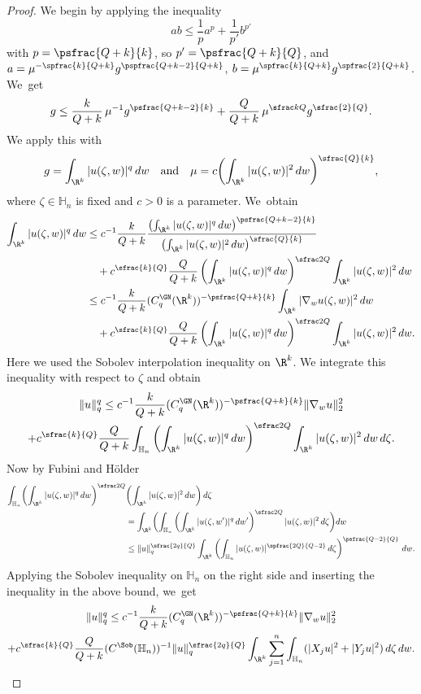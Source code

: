 \begin{proof}
We begin by applying the inequality
\[
ab \leq \frac1p a^p + \frac1{p'} b^{p'}
\]
with $p=\psfrac{Q+k}{k}$, so $p'=\psfrac{Q+k}{Q}$, and $a=\mu^{-\spfrac{k}{Q+k}} g^{\pspfrac{Q+k-2}{Q+k}}$, $b= \mu^{\spfrac{k}{Q+k}} g^{\spfrac{2}{Q+k}}$. We~get
\[
g \leq \frac{k}{Q+k}\,\mu^{-1} g^{\psfrac{Q+k-2}{k}} + \frac{Q}{Q+k}\,\mu^{\sfrac kQ} g^{\sfrac{2}{Q}}.
\]
We apply this with
\[
g = \int_{\R^k} |u(\zeta,w)|^q\,dw
\quad\text{and}\quad
\mu = c\biggl(\int_{\R^k} |u(\zeta,w)|^2\,dw\biggr)^{\sfrac{Q}{k}},
\]
where $\zeta\in\mathbb H_n$ is fixed and $c>0$ is a parameter. We~obtain
\begin{align*}
\int_{\R^k} |u(\zeta,w)|^q\,dw & \leq c^{-1} \frac{k}{Q+k} \frac{\left(\int_{\R^k} |u(\zeta,w)|^q\,dw\right)^{\psfrac{Q+k-2}{k}}}{\left(\int_{\R^k} |u(\zeta,w)|^2\,dw\right)^{\sfrac{Q}{k}}} \\
& \quad + c^{\sfrac{k}{Q}} \frac{Q}{Q+k} \left(\int_{\R^k} |u(\zeta,w)|^q\,dw\right)^{\sfrac2Q} \int_{\R^k} |u(\zeta,w)|^2\,dw \\
& \leq c^{-1} \frac{k}{Q+k} (C^\GN_{q}(\R^k))^{-\psfrac{Q+k}{k}} \int_{\R^k} |\nabla_w u(\zeta,w)|^2\,dw \\
& \quad
+ c^{\sfrac{k}{Q}} \frac{Q}{Q+k} \left(\int_{\R^k} |u(\zeta,w)|^q\,dw\right)^{\sfrac2Q} \int_{\R^k} |u(\zeta,w)|^2\,dw.
\end{align*}
Here we used the Sobolev interpolation inequality on $\R^k$.
We integrate this inequality with respect to $\zeta$ and obtain
\begin{multline*}
\|u\|_q^q \leq c^{-1} \frac{k}{Q+k} (C^\GN_{q}(\R^k))^{-\psfrac{Q+k}{k}} \| \nabla_w u\|_2^2 \\
+ c^{\sfrac{k}{Q}} \frac{Q}{Q+k} \int_{\mathbb H_n} \left(\int_{\R^k} |u(\zeta,w)|^q\,dw\right)^{\sfrac2Q} \int_{\R^k} |u(\zeta,w)|^2\,dw\,d\zeta.
\end{multline*}
Now by Fubini and Hölder
\begin{align*}
\int_{\mathbb H_n} \biggl(\int_{\R^k} |u(\zeta,w)|^q\,dw \biggr)^{\sfrac2Q}& \biggl(\int_{\R^k} |u(\zeta,w)|^2\,dw \biggr) \,d\zeta \\
& = \int_{\R^k} \biggl(\int_{\mathbb H_n} \left(\int_{\R^k} |u(\zeta,w')|^q\,dw'\right)^{\sfrac2Q} |u(\zeta,w)|^2\,d\zeta\biggr) dw \\
& \leq \| u \|_q^{\sfrac{2q}{Q}} \int_{\R^k} \left(\int_{\mathbb H_n} |u(\zeta,w)|^{\spfrac{2Q}{Q-2}} \,d\zeta\right)^{\psfrac{Q-2}{Q}}\,dw.
\end{align*}
Applying the Sobolev inequality on $\mathbb H_n$ on the right side and inserting the inequality in the above bound, we~get
\begin{multline*}
\|u\|_q^q \leq c^{-1} \frac{k}{Q+k} (C^\GN_{q}(\R^k))^{-\psfrac{Q+k}{k}} \| \nabla_w u\|_2^2 \\
+ c^{\sfrac{k}{Q}} \frac{Q}{Q+k} (C^\Sob(\mathbb H_n))^{-1} \| u \|_q^{\sfrac{2q}{Q}} \int_{\R^k} \sum_{j=1}^n \int_{\mathbb H_n} (|X_ju|^2 + |Y_ju|^2)\,d\zeta \,dw.
\end{multline*}


\end{proof}
